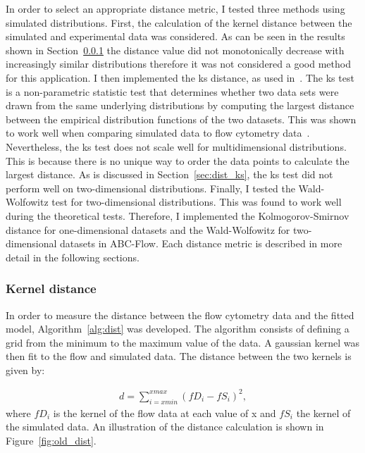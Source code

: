 In order to select an appropriate distance metric, I tested three methods using simulated distributions. First, the calculation of the kernel distance between the simulated and experimental data was considered. As can be seen in the results shown in Section~\ref{sec:dist_kernel} the distance value did not monotonically decrease with increasingly similar distributions therefore it was not considered a good method for this application. I then implemented the \acrfull{ks} distance, as used in~\textcite{Lillacci:2013hu}. The \acrshort{ks} test is a non-parametric statistic test that determines whether two data sets were drawn from the same underlying distributions by computing the largest distance between the empirical distribution functions of the two datasets. This was shown to work well when  comparing simulated data to flow cytometry data~\autocite{Lillacci:2013hu}. Nevertheless, the \acrshort{ks} test does not scale well for multidimensional distributions. This is because there is no unique way to order the data points to calculate the largest distance. As is discussed in Section~\ref{sec:dist_ks}, the \acrshort{ks} test did not perform well on two-dimensional distributions. Finally, I tested the Wald-Wolfowitz test for two-dimensional distributions. This was found to work well during the theoretical tests. Therefore, I implemented the Kolmogorov-Smirnov distance for one-dimensional datasets and the Wald-Wolfowitz for two-dimensional datasets in ABC-Flow. Each distance metric is described in more detail in the following sections.  

\label{sec:dist}
\subsubsection{Kernel distance}
\label{sec:dist_kernel}
In order to measure the distance between the flow cytometry data and the fitted model, Algorithm~\ref{alg:dist} was developed. The algorithm consists of defining a grid from the minimum to the maximum value of the data. A gaussian kernel was then fit to the flow and simulated data. The distance between the two kernels is given by:

\begin{align*}%
	d = \sum_{i=xmin}^{xmax} (fD_i - fS_i)^2,
\end{align*}
where $fD_i$ is the kernel of the flow data at each value of x and $fS_i$ the kernel of the simulated data. An illustration of the distance calculation is shown in Figure~\ref{fig:old_dist}.




